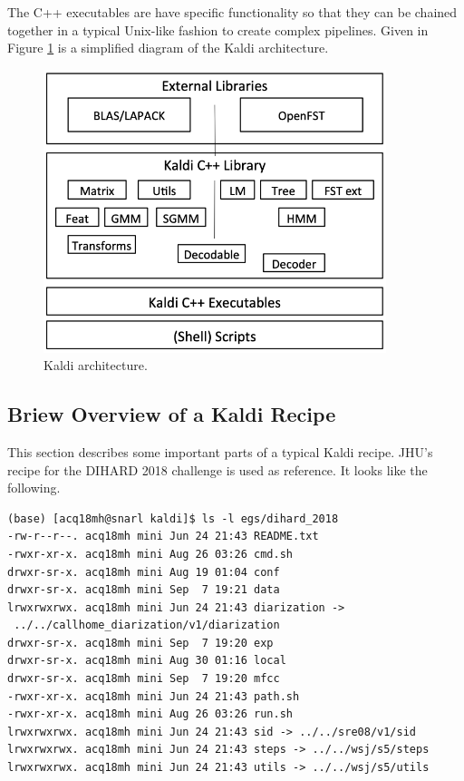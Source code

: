 	The C++ executables are have specific functionality so that they can be chained together in a typical Unix-like fashion to create complex pipelines. Given in Figure \ref{fig:fig-kaldi} is a simplified diagram of the Kaldi architecture.
	
	\begin{figure}[t]
		\includegraphics[width=10cm]{figures/kaldi.png}
		\centering
		\caption{Kaldi architecture.}
		\label{fig:fig-kaldi}
	\end{figure}
	
	\subsection{Briew Overview of a Kaldi Recipe}
	This section describes some important parts of a typical Kaldi recipe. JHU's recipe for the DIHARD 2018 challenge  is used as reference. It looks like the following.
	
	\begin{verbatim}
(base) [acq18mh@snarl kaldi]$ ls -l egs/dihard_2018
-rw-r--r--. acq18mh mini Jun 24 21:43 README.txt
-rwxr-xr-x. acq18mh mini Aug 26 03:26 cmd.sh
drwxr-sr-x. acq18mh mini Aug 19 01:04 conf
drwxr-sr-x. acq18mh mini Sep  7 19:21 data
lrwxrwxrwx. acq18mh mini Jun 24 21:43 diarization ->
 ../../callhome_diarization/v1/diarization
drwxr-sr-x. acq18mh mini Sep  7 19:20 exp
drwxr-sr-x. acq18mh mini Aug 30 01:16 local
drwxr-sr-x. acq18mh mini Sep  7 19:20 mfcc
-rwxr-xr-x. acq18mh mini Jun 24 21:43 path.sh
-rwxr-xr-x. acq18mh mini Aug 26 03:26 run.sh
lrwxrwxrwx. acq18mh mini Jun 24 21:43 sid -> ../../sre08/v1/sid
lrwxrwxrwx. acq18mh mini Jun 24 21:43 steps -> ../../wsj/s5/steps
lrwxrwxrwx. acq18mh mini Jun 24 21:43 utils -> ../../wsj/s5/utils
	\end{verbatim}
	
